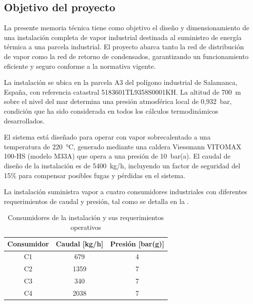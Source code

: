 
\subsection{Objetivo del proyecto}
\label{subsec:objetivo-proyecto}

La presente memoria técnica tiene como objetivo el diseño y dimensionamiento de una instalación completa de vapor industrial destinada al suministro de energía térmica a una parcela industrial. El proyecto abarca tanto la red de distribución de vapor como la red de retorno de condensados, garantizando un funcionamiento eficiente y seguro conforme a la normativa vigente.

La instalación se ubica en la parcela A3 del polígono industrial de Salamanca, España, con referencia catastral 5183601TL9358S0001KH. La altitud de 700~m sobre el nivel del mar determina una presión atmosférica local de 0,932~bar, condición que ha sido considerada en todos los cálculos termodinámicos desarrollados.

El sistema está diseñado para operar con vapor sobrecalentado a una temperatura de 220~°C, generado mediante una caldera Viessmann VITOMAX 100-HS (modelo M33A) que opera a una presión de 10~bar(a). El caudal de diseño de la instalación es de 5400~kg/h, incluyendo un factor de seguridad del 15\% para compensar posibles fugas y pérdidas en el sistema.

La instalación suministra vapor a cuatro consumidores industriales con diferentes requerimientos de caudal y presión, tal como se detalla en la .

\begin{table}[H]
	\centering
	\caption{Consumidores de la instalación y sus requerimientos operativos}
	\label{tab:consumidores-proyecto}
	\begin{tabular}{ccc}
		\toprule
		\textbf{Consumidor} & \textbf{Caudal [kg/h]} & \textbf{Presión [bar(g)]} \\
		\midrule
		C1                  & 679                    & 4                         \\
		C2                  & 1359                   & 7                         \\
		C3                  & 340                    & 7                         \\
		C4                  & 2038                   & 7                         \\
		\bottomrule
	\end{tabular}
\end{table}

